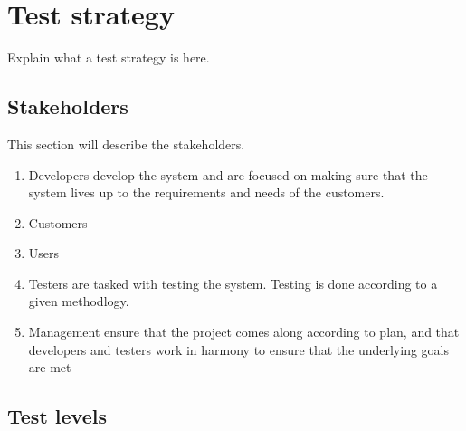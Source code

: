 \section{Test strategy}

Explain what a test strategy is here. 

\subsection{Stakeholders}

This section will describe the stakeholders.

\begin{enumerate}
    \item Developers develop the system and are focused on making sure that the system lives up to the requirements and needs of the customers. 
    \item Customers 
    \item Users
    \item Testers are tasked with testing the system. Testing is done according to a given methodlogy. 
    \item Management ensure that the project comes along according to plan, and that developers and testers work in harmony to ensure that the underlying goals are met
\end{enumerate}






\subsection{Test levels}

